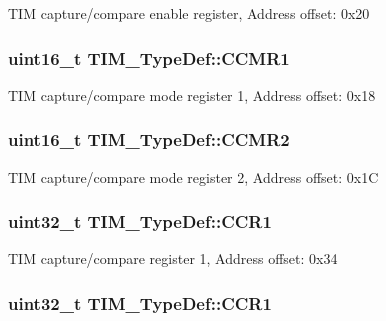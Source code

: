 T\-I\-M capture/compare enable register, Address offset\-: 0x20 \hypertarget{struct_t_i_m___type_def_a9094f9bb312461d2fc1499f5f8d91c64}{
\subsubsection[{C\-C\-M\-R1}]{ uint16\-\_\-t T\-I\-M\-\_\-\-Type\-Def\-::\-C\-C\-M\-R1}}\label{struct_t_i_m___type_def_a9094f9bb312461d2fc1499f5f8d91c64}
T\-I\-M capture/compare mode register 1, Address offset\-: 0x18 \hypertarget{struct_t_i_m___type_def_a22bb9f39aae46365d3ec3c5973f90039}{
\subsubsection[{C\-C\-M\-R2}]{ uint16\-\_\-t T\-I\-M\-\_\-\-Type\-Def\-::\-C\-C\-M\-R2}}\label{struct_t_i_m___type_def_a22bb9f39aae46365d3ec3c5973f90039}
T\-I\-M capture/compare mode register 2, Address offset\-: 0x1\-C \hypertarget{struct_t_i_m___type_def_a0dd9c06729a5eb6179c6d0d60faca7ed}{
\subsubsection[{C\-C\-R1}]{ uint32\-\_\-t T\-I\-M\-\_\-\-Type\-Def\-::\-C\-C\-R1}}\label{struct_t_i_m___type_def_a0dd9c06729a5eb6179c6d0d60faca7ed}
T\-I\-M capture/compare register 1, Address offset\-: 0x34 \hypertarget{struct_t_i_m___type_def_a0dd9c06729a5eb6179c6d0d60faca7ed}{
\subsubsection[{C\-C\-R1}]{ uint32\-\_\-t T\-I\-M\-\_\-\-Type\-Def\-::\-C\-C\-R1}}\label{struct_t_i_m___type_def_a0dd9c06729a5eb6179c6d0d60faca7ed}
